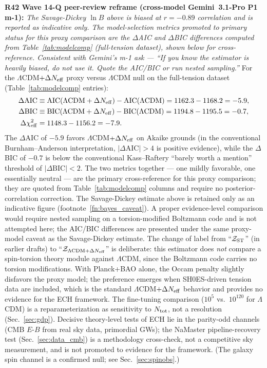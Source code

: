\documentclass[aps,prd,twocolumn,superscriptaddress,showpacs,preprintnumbers,nofootinbib,longbibliography,floatfix]{revtex4-2}
\newcommand{\Neff}{N_{\rm eff}}
\begin{document}
\noindent\textbf{R42 Wave 14-Q peer-review reframe (cross-model Gemini~3.1-Pro P1 m-1):} \emph{The Savage-Dickey $\ln B$ above is biased at $r=-0.89$ correlation and is reported as indicative only. The model-selection metrics promoted to primary status for this proxy comparison are the $\Delta$AIC and $\Delta$BIC differences computed from Table~\ref{tab:modelcomp} (full-tension dataset), shown below for cross-reference. Consistent with Gemini's m-1 ask --- ``If you know the estimator is heavily biased, do not use it. Quote the AIC/BIC or run nested sampling.''} For the $\Lambda$CDM$+\Delta\Neff$ proxy versus $\Lambda$CDM null on the full-tension dataset (Table~\ref{tab:modelcomp} entries):
\begin{align}
\Delta\text{AIC} &\equiv \text{AIC}(\Lambda\text{CDM}+\Delta\Neff) - \text{AIC}(\Lambda\text{CDM}) = 1162.3 - 1168.2 = -5.9, \nonumber \\
\Delta\text{BIC} &\equiv \text{BIC}(\Lambda\text{CDM}+\Delta\Neff) - \text{BIC}(\Lambda\text{CDM}) = 1194.8 - 1195.5 = -0.7, \nonumber \\
\Delta\chi^2_{\rm eff} &= 1148.3 - 1156.2 = -7.9.
\end{align}
The $\Delta$AIC of $-5.9$ favors $\Lambda$CDM$+\Delta\Neff$ on Akaike grounds (in the conventional Burnham--Anderson interpretation, $|\Delta\text{AIC}|>4$ is positive evidence), while the $\Delta$BIC of $-0.7$ is below the conventional Kass--Raftery ``barely worth a mention'' threshold of $|\Delta\text{BIC}|<2$. The two metrics together --- one mildly favorable, one essentially neutral --- are the primary cross-reference for this proxy comparison; they are quoted from Table~\ref{tab:modelcomp} columns and require no posterior-correlation correction. The Savage-Dickey estimate above is retained only as an indicative figure (footnote~\ref{fn:bayes_caveat}). A proper evidence-level comparison would require nested sampling on a torsion-modified Boltzmann code and is not attempted here; the AIC/BIC differences are presented under the same proxy-model caveat as the Savage-Dickey estimate. The change of label from ``$\mathcal{Z}_{\rm ST}$'' (in earlier drafts) to ``$\mathcal{Z}_{\Lambda\text{CDM}+\Delta\Neff}$'' is deliberate: this estimator does \emph{not} compare a spin-torsion theory module against $\Lambda$CDM, since the Boltzmann code carries no torsion modifications. With Planck+BAO alone, the Occam penalty slightly disfavors the proxy model; the preference emerges when SH0ES-driven tension data are included, which is the standard $\Lambda$CDM$+\Delta\Neff$ behavior and provides no evidence for the ECH framework. The fine-tuning comparison ($10^5$ vs.\ $10^{120}$ for $\Lambda$CDM) is a reparameterization as sensitivity to $N_{\rm tot}$, not a resolution (Sec.~\ref{sec:gdp}). Decisive theory-level tests of ECH lie in the parity-odd channels (CMB $E$-$B$ from real sky data, primordial GWs); the NaMaster pipeline-recovery test (Sec.~\ref{sec:data_cmb}) is a methodology cross-check, not a competitive sky measurement, and is not promoted to evidence for the framework. (The galaxy spin channel is a confirmed null; see Sec.~\ref{sec:spinobs}.)
\end{document}
